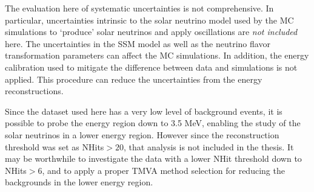 The evaluation here of systematic uncertainties is not comprehensive. In particular, uncertainties intrinsic to the solar neutrino model used by the MC simulations to `produce' solar neutrinos and apply oscillations are {\em not included} here. The uncertainties in the SSM model as well as the neutrino flavor transformation parameters can affect the MC simulations. In addition, the energy calibration used to mitigate the difference between data and simulations is not applied. This procedure can reduce the uncertainties from the energy reconstructions. 

Since the dataset used here has a very low level of background events, it is possible to probe the energy region down to 3.5 MeV, enabling the study of the solar neutrinos in a lower energy region. However since the reconstruction threshold was set as NHits$>20$, that analysis is not included in the thesis. It may be worthwhile to investigate the data with a lower NHit threshold down to NHits$>6$, and to apply a proper TMVA method selection for reducing the backgrounds in the lower energy region.
